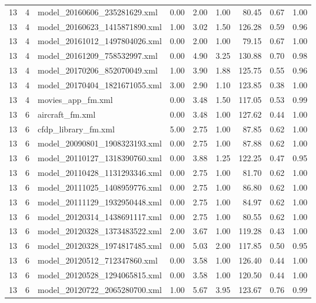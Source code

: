 \begin{table}[ht]
\begin{tabular}{rrlrrrrrr}
   13 &   4 & model\_20160606\_235281629.xml & 0.00 & 2.00 & 1.00 & 80.45 & 0.67 & 1.00 \\ 
   13 &   4 & model\_20160623\_1415871890.xml & 1.00 & 3.02 & 1.50 & 126.28 & 0.59 & 0.96 \\ 
   13 &   4 & model\_20161012\_1497804026.xml & 0.00 & 2.00 & 1.00 & 79.15 & 0.67 & 1.00 \\ 
   13 &   4 & model\_20161209\_758532997.xml & 0.00 & 4.90 & 3.25 & 130.88 & 0.70 & 0.98 \\ 
   13 &   4 & model\_20170206\_852070049.xml & 1.00 & 3.90 & 1.88 & 125.75 & 0.55 & 0.96 \\ 
   13 &   4 & model\_20170404\_1821671055.xml & 3.00 & 2.90 & 1.10 & 123.85 & 0.38 & 1.00 \\ 
   13 &   4 & movies\_app\_fm.xml & 0.00 & 3.48 & 1.50 & 117.05 & 0.53 & 0.99 \\ 
   13 &   6 & aircraft\_fm.xml & 0.00 & 3.48 & 1.00 & 127.62 & 0.44 & 1.00 \\ 
   13 &   6 & cfdp\_library\_fm.xml & 5.00 & 2.75 & 1.00 & 87.85 & 0.62 & 1.00 \\ 
   13 &   6 & model\_20090801\_1908323193.xml & 0.00 & 2.75 & 1.00 & 87.88 & 0.62 & 1.00 \\ 
   13 &   6 & model\_20110127\_1318390760.xml & 0.00 & 3.88 & 1.25 & 122.25 & 0.47 & 0.95 \\ 
   13 &   6 & model\_20110428\_1131293346.xml & 0.00 & 2.75 & 1.00 & 81.70 & 0.62 & 1.00 \\ 
   13 &   6 & model\_20111025\_1408959776.xml & 0.00 & 2.75 & 1.00 & 86.80 & 0.62 & 1.00 \\ 
   13 &   6 & model\_20111129\_1932950448.xml & 0.00 & 2.75 & 1.00 & 84.97 & 0.62 & 1.00 \\ 
   13 &   6 & model\_20120314\_1438691117.xml & 0.00 & 2.75 & 1.00 & 80.55 & 0.62 & 1.00 \\ 
   13 &   6 & model\_20120328\_1373483522.xml & 2.00 & 3.67 & 1.00 & 119.28 & 0.43 & 1.00 \\ 
   13 &   6 & model\_20120328\_1974817485.xml & 0.00 & 5.03 & 2.00 & 117.85 & 0.50 & 0.95 \\ 
   13 &   6 & model\_20120512\_712347860.xml & 0.00 & 3.58 & 1.00 & 126.40 & 0.44 & 1.00 \\ 
   13 &   6 & model\_20120528\_1294065815.xml & 0.00 & 3.58 & 1.00 & 120.50 & 0.44 & 1.00 \\ 
   13 &   6 & model\_20120722\_2065280700.xml & 1.00 & 5.67 & 3.95 & 123.67 & 0.76 & 0.99 \\ 

\end{tabular}
\end{table}
